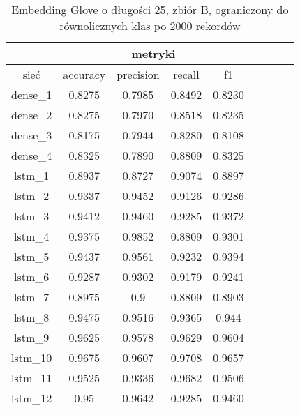\begin{table}[p] \label{tab:wyniki_glove_B_lim} \centering
    \caption{Embedding Glove o długości 25, zbiór B, ograniczony do równolicznych klas po 2000 rekordów}
    \begin{tabular} {|c|c|c|c|c|c|c|c|c| }    \hline
                 & \multicolumn{4}{c|}{metryki}                               \\ \hline
        sieć     & accuracy                     & precision & recall & f1     \\ \hline
        dense\_1 & 0.8275                       & 0.7985    & 0.8492 & 0.8230 \\ \hline
        dense\_2 & 0.8275                       & 0.7970    & 0.8518 & 0.8235 \\ \hline
        dense\_3 & 0.8175                       & 0.7944    & 0.8280 & 0.8108 \\ \hline
        dense\_4 & 0.8325                       & 0.7890    & 0.8809 & 0.8325 \\ \hline
        lstm\_1  & 0.8937                       & 0.8727    & 0.9074 & 0.8897 \\ \hline
        lstm\_2  & 0.9337                       & 0.9452    & 0.9126 & 0.9286 \\ \hline
        lstm\_3  & 0.9412                       & 0.9460    & 0.9285 & 0.9372 \\ \hline
        lstm\_4  & 0.9375                       & 0.9852    & 0.8809 & 0.9301 \\ \hline
        lstm\_5  & 0.9437                       & 0.9561    & 0.9232 & 0.9394 \\ \hline
        lstm\_6  & 0.9287                       & 0.9302    & 0.9179 & 0.9241 \\ \hline
        lstm\_7  & 0.8975                       & 0.9       & 0.8809 & 0.8903 \\ \hline
        lstm\_8  & 0.9475                       & 0.9516    & 0.9365 & 0.944  \\ \hline
        lstm\_9  & 0.9625                       & 0.9578    & 0.9629 & 0.9604 \\ \hline
        lstm\_10 & 0.9675                       & 0.9607    & 0.9708 & 0.9657 \\ \hline
        lstm\_11 & 0.9525                       & 0.9336    & 0.9682 & 0.9506 \\ \hline
        lstm\_12 & 0.95                         & 0.9642    & 0.9285 & 0.9460 \\ \hline

\end{tabular}
\end{table}
